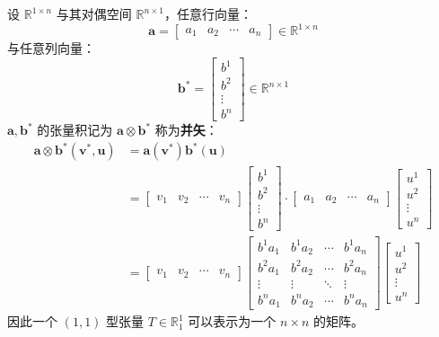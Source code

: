 \begin{example}[并矢 Dyadics]
    设 $\mathbb{R}^{1\times n}$ 与其对偶空间 $\mathbb{R}^{n\times 1}$，任意行向量：
    \[
        \mathbf{a} = \begin{bmatrix}
            a_1 & a_2 & \cdots & a_n
        \end{bmatrix} \in \mathbb{R}^{1\times n}
    \]
    与任意列向量：
    \[
        \mathbf{b}^* = \begin{bmatrix}
            b^1 \\ b^2 \\ \vdots \\ b^n
        \end{bmatrix} \in \mathbb{R}^{n\times 1}
    \]
    $\mathbf{a}, \mathbf{b}^*$ 的张量积记为 $\mathbf{a}\otimes \mathbf{b}^*$ 称为\textbf{并矢}：
    \begin{align*}
        \mathbf{a}\otimes \mathbf{b}^*(\mathbf{v}^*,\mathbf{u}) &= \mathbf{a}(\mathbf{v}^*)\mathbf{b}^*(\mathbf{u})\\
        &= \begin{bmatrix}
            v_1 & v_2 & \cdots & v_n
        \end{bmatrix} \begin{bmatrix}
            b^1 \\ b^2 \\ \vdots \\ b^n
        \end{bmatrix} \cdot \begin{bmatrix}
            a_1 & a_2 & \cdots & a_n
        \end{bmatrix} \begin{bmatrix}
            u^1 \\ u^2 \\ \vdots \\ u^n
        \end{bmatrix} \\
        &= \begin{bmatrix}
            v_1 & v_2 & \cdots & v_n
        \end{bmatrix} \begin{bmatrix}
            b^1a_1 & b^1a_2 & \cdots & b^1a_n \\
            b^2a_1 & b^2a_2 & \cdots & b^2a_n \\
            \vdots & \vdots & \ddots & \vdots \\
            b^na_1 & b^na_2 & \cdots & b^na_n
        \end{bmatrix}\begin{bmatrix}
            u^1 \\ u^2 \\ \vdots \\ u^n
        \end{bmatrix}
    \end{align*}
    因此一个 $(1,1)$ 型张量 $T \in \mathbb{R}^1_1$ 可以表示为一个 $n\times n$ 的矩阵。
    \label{ex:dyadics}
\end{example}

